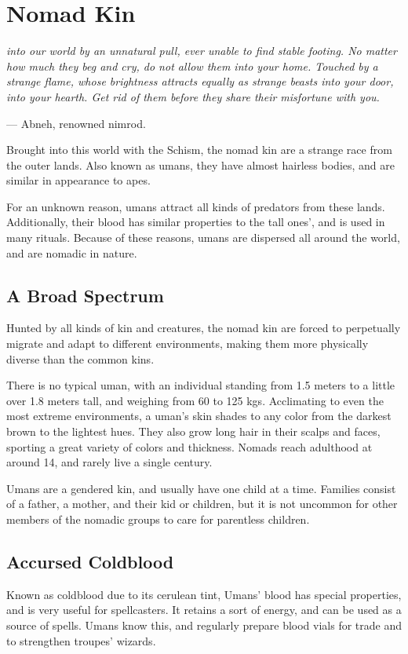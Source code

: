 
\section{Nomad Kin}
\begin{linenumbers}
\textit{into our world by an unnatural pull, ever unable to find stable footing.
No matter how much they beg and cry, do not allow them into your home.
Touched by a strange flame, whose brightness attracts equally as strange beasts into your door, into your hearth.
Get rid of them before they share their misfortune with you.}

\hspace*{\fill} --- Abneh, renowned nimrod.

Brought into this world with the Schism, the nomad kin are a strange race from the outer lands.
Also known as umans, they have almost hairless bodies, and are similar in appearance to apes.

For an unknown reason, umans attract all kinds of predators from these lands.
Additionally, their blood has similar properties to the tall ones', and is used in many rituals.
Because of these reasons, umans are dispersed all around the world, and are nomadic in nature.

\subsection*{A Broad Spectrum}
Hunted by all kinds of kin and creatures, the nomad kin are forced to perpetually migrate and adapt to different environments, making them more physically diverse than the common kins.

There is no typical uman, with an individual standing from 1.5 meters to a little over 1.8 meters tall, and weighing from 60 to 125 kgs.
Acclimating to even the most extreme environments, a uman's skin shades to any color from the darkest brown to the lightest hues.
They also grow long hair in their scalps and faces, sporting a great variety of colors and thickness.
Nomads reach adulthood at around 14, and rarely live a single century.

Umans are a gendered kin, and usually have one child at a time.
Families consist of a father, a mother, and their kid or children, but it is not uncommon for other members of the nomadic groups to care for parentless children.

\subsection*{Accursed Coldblood}
Known as coldblood due to its cerulean tint, Umans' blood has special properties, and is very useful for spellcasters.
It retains a sort of energy, and can be used as a source of spells.
Umans know this, and regularly prepare blood vials for trade and to strengthen troupes' wizards.


\end{linenumbers}
